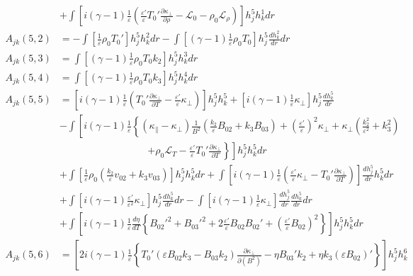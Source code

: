 \documentclass[11pt, fleqn]{article}
\newcommand{\HL}{\mathscr{L}}
\newcommand{\eps}{\varepsilon}
\begin{document}
\begin{align*}
				 &+  \int \left[i(\gamma - 1)\frac{1}{\eps}\left(\frac{\eps'}{\eps}T_0'\frac{\partial \kappa_\bot}{\partial \rho} - \HL_0 - \rho_0\HL_\rho\right)\right] h_j^5h_k^1 dr																	\\
	A_{jk}(5, 2) &= -\int \left[\frac{1}{\eps}\rho_0T_0'\right] h_j^5h_k^2 dr - \int \left[(\gamma - 1)\frac{1}{\eps}\rho_0T_0\right] h_j^5\frac{dh_k^2}{dr} dr	\\
	A_{jk}(5, 3) &=  \int \left[(\gamma - 1)\frac{1}{\eps}\rho_0T_0k_2\right] h_j^5 h_k^3 dr															\\
	A_{jk}(5, 4) &=  \int \left[(\gamma - 1)\frac{1}{\eps}\rho_0T_0k_3\right] h_j^5 h_k^4 dr															\\
	A_{jk}(5, 5) &=  \left[i(\gamma - 1)\frac{1}{\eps}\left(T_0'\frac{\partial \kappa_\bot}{\partial T} - \frac{\eps'}{\eps}\kappa_\bot\right)\right] h_j^5 h_k^5 + \left[i(\gamma - 1)\frac{1}{\eps}\kappa_\bot\right]h_j^5 \frac{dh_k^5}{dr} 			\\
				 &-  \int \left[i(\gamma - 1)\frac{1}{\eps}\left\{(\kappa_\parallel - \kappa_\bot)\frac{1}{B^2}\left(\frac{k_2}{\eps}B_{02} + k_3B_{03}\right) + \left(\frac{\eps'}{\eps}\right)^2\kappa_\bot
				 																																								   + \kappa_\bot\left(\frac{k_2^2}{\eps^2} + k_3^2\right)\right.\right. \\
				 &\qquad\qquad\qquad\qquad~~~~ 									  \left.\left.+ \rho_0\HL_T - \frac{\eps'}{\eps}T_0'\frac{\partial \kappa_\bot}{\partial T}\right\} \right] h_j^5h_k^5 dr												\\
				 &+  \int \left[\frac{1}{\eps}\rho_0\left(\frac{k_2}{\eps}v_{02} + k_3v_{03}\right)\right] h_j^5 h_k^5 dr 
				 	   +\int\left[i(\gamma - 1)\frac{1}{\eps}\left(\frac{\eps'}{\eps}\kappa_\bot - T_0'\frac{\partial \kappa_\bot}{\partial T}\right)\right] \frac{dh_j^5}{dr} h_k^5 dr																	\\
				 &+  \int\left[i(\gamma - 1)\frac{\eps'}{\eps^2}\kappa_\bot\right] h_j^5 \frac{dh_k^5}{dr} dr - \int \left[i(\gamma - 1)\frac{1}{\eps}\kappa_\bot\right] \frac{dh_j^5}{dr}\frac{dh_k^5}{dr} dr											\\
				 &+  \int\left[i(\gamma - 1)\frac{1}{\eps}\frac{d\eta}{dT}\left\{B_{02}'^2 + B_{03}'^2 + 2\frac{\eps'}{\eps}B_{02}B_{02}' + \left(\frac{\eps'}{\eps}B_{02}\right)^2\right\}\right] h_j^5 h_k^5 dr										\\
	A_{jk}(5, 6) &=  \left[2i(\gamma-1)\frac{1}{\eps}\left\{T_0'(\eps B_{02}k_3 - B_{03}k_2)\frac{\partial \kappa_\bot}{\partial(B^2)} - \eta B_{03}'k_2 + \eta k_3(\eps B_{02})' \right\} \right] h_j^5 h_k^6											\\

\end{align*}
\end{document}
